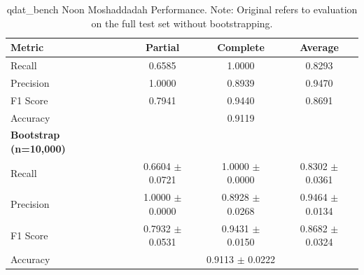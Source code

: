 \begin{table}[t]
	\centering
	\begin{tabular}{lccc}
		\hline
		\textbf{Metric}               & \textbf{Partial}                        & \textbf{Complete}   & \textbf{Average}    \\
		\hline
		Recall                        & 0.6585                                  & 1.0000              & 0.8293              \\
		Precision                     & 1.0000                                  & 0.8939              & 0.9470              \\
		F1 Score                      & 0.7941                                  & 0.9440              & 0.8691              \\
		Accuracy                      & \multicolumn{3}{c}{0.9119}                                                          \\
		\hline
		\textbf{Bootstrap (n=10,000)} & \textbf{}                               & \textbf{}           & \textbf{}           \\
		Recall                        & 0.6604 $\pm$ 0.0721                     & 1.0000 $\pm$ 0.0000 & 0.8302 $\pm$ 0.0361 \\
		Precision                     & 1.0000 $\pm$ 0.0000                     & 0.8928 $\pm$ 0.0268 & 0.9464 $\pm$ 0.0134 \\
		F1 Score                      & 0.7932 $\pm$ 0.0531                     & 0.9431 $\pm$ 0.0150 & 0.8682 $\pm$ 0.0324 \\
		Accuracy                      & \multicolumn{3}{c}{0.9113 $\pm$ 0.0222}                                             \\
		\hline
	\end{tabular}
	\caption{qdat\_bench Noon Moshaddadah Performance. Note: Original refers to evaluation on the full test set without bootstrapping.}
	\label{tab:qdat_noon_moshaddadah}
\end{table}

